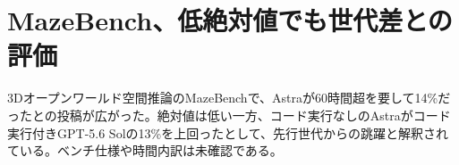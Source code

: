 \section{MazeBench、低絶対値でも世代差との評価}
3Dオープンワールド空間推論のMazeBenchで、Astraが60時間超を要して14\%だったとの投稿が広がった。絶対値は低い一方、コード実行なしのAstraがコード実行付きGPT-5.6 Solの13\%を上回ったとして、先行世代からの跳躍と解釈されている。ベンチ仕様や時間内訳は未確認である。
